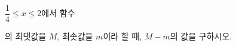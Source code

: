 $\dfrac{1}{4}\le x\le 2$에서 함수 \par\smallskip{}\par\smallskip\noindent 의 최댓값을 $M$, 최솟값을 $m$이라 할 때, $M-m$의 값을 구하시오.
